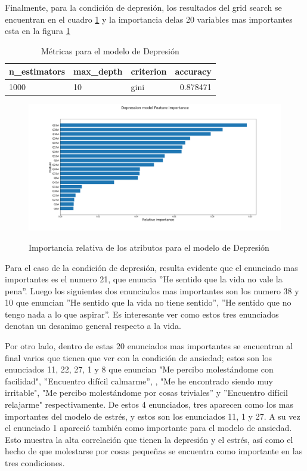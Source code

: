  \medbreak

 Finalmente, para la condición de depresión, los resultados del grid search se encuentran en el cuadro \ref{table:modelo_depresion} y la importancia delas 20 variables mas importantes esta en la figura \ref{variables_depresion} 
 


\begin{table}[ht]
\centering
\caption{Métricas para el modelo de Depresión}
\begin{tabular}{lllr}
\toprule
n\_estimators & max\_depth & criterion &  accuracy \\
\midrule
1000 & 10 & gini & 0.878471 \\
\bottomrule
\end{tabular}
\label{table:modelo_depresion}
\end{table}%

\begin{figure}[h]
\caption{Importancia relativa de los atributos para el modelo de Depresión}
\centering
\includegraphics[width=\textwidth,height=\textheight,keepaspectratio]{Media/Pictures/Depression model Feature importance.png} 
\label{variables_depresion}
\end{figure}

Para el caso de la condición de depresión, resulta evidente que el enunciado mas importantes es el numero 21, que enuncia ''He sentido que la vida no vale la pena''. Luego los siguientes dos enunciados mas importantes son los numero 38 y 10 que enuncian ''He sentido que la vida no tiene sentido'', ''He sentido que no tengo nada a lo que aspirar''. Es interesante ver como estos tres enunciados denotan un desanimo general respecto a la vida.

 \medbreak

Por otro lado, dentro de estas 20 enunciados mas importantes se encuentran al final varios que tienen que ver con la condición de ansiedad; estos son los enunciados 11, 22, 27, 1 y  8 que enuncian "Me percibo molestándome con facilidad",  ''Encuentro difícil calmarme'',  , "Me he encontrado siendo muy irritable", "Me percibo molestándome por cosas triviales'' y  ''Encuentro difícil relajarme" respectivamente. De estos 4 enunciados, tres aparecen como los mas importantes del modelo de estrés, y estos son los enunciados 11, 1 y 27. A su vez el enunciado 1 apareció también como importante para el modelo de ansiedad. Esto muestra la alta correlación que tienen la depresión y el estrés, así como el hecho de que molestarse por cosas pequeñas se encuentra como importante en las tres condiciones.

